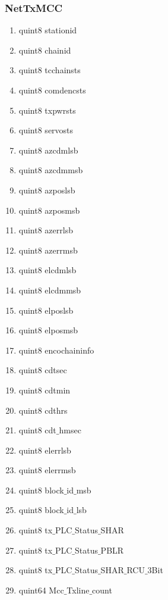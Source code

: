 \begin{enumerate}
\subsubsection{NetTxMCC}
\begin{enumerate}
	\item quint8 stationid
	\item quint8 chainid
	\item quint8 tcchainsts
	\item quint8 comdencsts
	\item quint8 txpwrsts
	\item quint8 servosts
	\item quint8 azcdmlsb
	\item quint8 azcdmmsb
	\item quint8 azposlsb
	\item quint8 azposmsb
	\item quint8 azerrlsb
	\item quint8 azerrmsb
	\item quint8 elcdmlsb
	\item quint8 elcdmmsb
	\item quint8  elposlsb
	\item quint8  elposmsb
	\item quint8 encochaininfo
	\item quint8 cdtsec
	\item quint8 cdtmin
	\item quint8 cdthrs
	\item quint8 cdt$\_$hmsec
	\item quint8 elerrlsb
	\item quint8 elerrmsb
	\item quint8 block$\_$id$\_$msb
	\item quint8 block$\_$id$\_$lsb
	\item quint8 tx$\_$PLC$\_$Status$\_$SHAR
	\item quint8 tx$\_$PLC$\_$Status$\_$PBLR
	\item quint8 tx$\_$PLC$\_$Status$\_$SHAR$\_$RCU$\_$3Bit
	\item quint64 Mcc$\_$Txline$\_$count
                  
\end{enumerate}


\end{enumerate}
